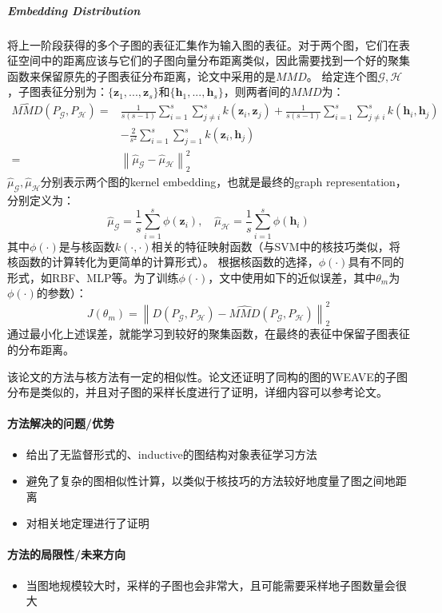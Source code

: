 \subparagraph{Embedding Distribution}
将上一阶段获得的多个子图的表征汇集作为输入图的表征。对于两个图，它们在表征空间中的距离应该与它们的子图向量分布距离类似，因此需要找到一个好的聚集函数来保留原先的子图表征分布距离，论文中采用的是$MMD$。
给定连个图$\mathcal{G}, \mathcal{H}$，子图表征分别为：$\{\mathbf{z}_1, ..., \mathbf{z}_s\}$和$\{\mathbf{h}_1, ..., \mathbf{h}_s\}$，则两者间的$MMD$为：
$$
\begin{aligned}
	\widehat{M M D}\left(P_{\mathcal{G}}, P_{\mathcal{H}}\right)=& \frac{1}{s(s-1)} \sum_{i=1}^{s} \sum_{j \neq i}^{s} k\left(\mathbf{z}_{i}, \mathbf{z}_{j}\right)+\frac{1}{s(s-1)} \sum_{i=1}^{s} \sum_{j \neq i}^{s} k\left(\mathbf{h}_{i}, \mathbf{h}_{j}\right) \\
	&-\frac{2}{s^{2}} \sum_{i=1}^{s} \sum_{j=1}^{s} k\left(\mathbf{z}_{i}, \mathbf{h}_{j}\right) \\
	=&\left\|\hat{\mu}_{\mathcal{G}}-\hat{\mu}_{\mathcal{H}}\right\|_{2}^{2}
\end{aligned}
$$
$\hat{\mu}_{\mathcal{G}}, \hat{\mu}_{\mathcal{H}}$分别表示两个图的kernel embedding，也就是最终的graph representation，分别定义为：
$$
\hat{\mu}_{\mathcal{G}}=\frac{1}{s} \sum_{i=1}^{s} \phi\left(\mathbf{z}_{i}\right), \quad \hat{\mu}_{\mathcal{H}}=\frac{1}{s} \sum_{i=1}^{s} \phi\left(\mathbf{h}_{i}\right)
$$
其中$\phi(\cdot)$是与核函数$k(\cdot, \cdot)$相关的特征映射函数（与SVM中的核技巧类似，将核函数的计算转化为更简单的计算形式）。
根据核函数的选择，$\phi(\cdot)$具有不同的形式，如RBF、MLP等。为了训练$\phi(\cdot)$，文中使用如下的近似误差，其中$\theta_m$为$\phi(\cdot)$的参数）：
$$
J\left(\theta_{m}\right)=\left\|D\left(P_{\mathcal{G}}, P_{\mathcal{H}}\right)-\widehat{M M D}\left(P_{\mathcal{G}}, P_{\mathcal{H}}\right)\right\|_{2}^{2}
$$
通过最小化上述误差，就能学习到较好的聚集函数，在最终的表征中保留子图表征的分布距离。

该论文的方法与核方法有一定的相似性。论文还证明了同构的图的WEAVE的子图分布是类似的，并且对子图的采样长度进行了证明，详细内容可以参考论文。

\paragraph{方法解决的问题/优势}

\begin{itemize}

	\item 给出了无监督形式的、inductive的图结构对象表征学习方法
	\item 避免了复杂的图相似性计算，以类似于核技巧的方法较好地度量了图之间地距离
	\item 对相关地定理进行了证明

\end{itemize}



\paragraph{方法的局限性/未来方向}

\begin{itemize}

	\item 当图地规模较大时，采样的子图也会非常大，且可能需要采样地子图数量会很大

\end{itemize}